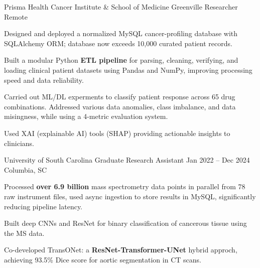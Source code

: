 
\vspace*{-0.2cm}

\begin{cventries}


\cventry
    {Prisma Health Cancer Institute \hspace{0.1cm} \& \hspace{0.1cm} School of Medicine Greenville}
    {Researcher}
    {}
    {Remote}
    {
        \begin{cvitemsfree}
            \item{Designed and deployed a normalized MySQL cancer-profiling database with SQLAlchemy ORM; database now exceeds 10,000 curated patient records.}
            \item{Built a modular Python \textbf{ETL pipeline} for parsing, cleaning, verifying, and loading clinical patient datasets using Pandas and NumPy, improving processing speed and data reliability.}
            \item{Carried out ML/DL experments to classify patient response across 65 drug combinations. Addressed various data anomalies, class imbalance, and data misingness, while using a 4-metric evaluation system.}
            \item{Used XAI (explainable AI) tools (SHAP) providing actionable insights to clinicians.}
        \end{cvitemsfree}
    }

\vspace*{0.2cm}

\cventry
    {University of South Carolina}
    {Graduate Research Assistant}
    {Jan 2022 -- Dec 2024}
    {Columbia, SC}
    {
        \begin{cvitemsfree}
            \item{Processed \textbf{over 6.9 billion} mass spectrometry data points in parallel from 78 raw instrument files, used async ingestion to store results in MySQL, significantly reducing pipeline latency.}
            \item{Built deep CNNs and ResNet for binary classification of cancerous tissue using the MS data.}
            \item{Co-developed TransONet: a \textbf{ResNet-Transformer-UNet} hybrid approch, achieving 93.5\% Dice score for aortic segmentation in CT scans.}
        \end{cvitemsfree}
    }


\end{cventries}
